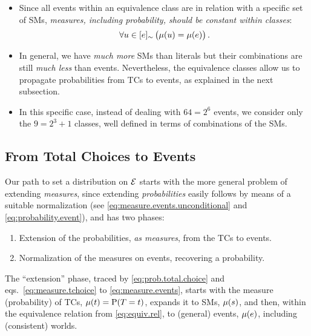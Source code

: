 \documentclass[a4paper, 10pt]{article}
\newcommand{\at}[1]{\ensuremath{\!\del{#1}}}
\newcommand{\fml}[1]{\ensuremath{{\cal #1}}}
\newcommand{\pr}[1]{\ensuremath{\mathrm{P}\at{#1}}}
\newcommand{\pw}[1]{\ensuremath{\mu\at{#1}}}
\newcommand{\class}[1]{\ensuremath{[{#1}]_{\sim}}}
\begin{document}
\begin{itemize}
    \item Since all events within an equivalence class are in relation with a specific set of \aclp{SM}, \emph{measures, including probability, should be constant within classes}:
          \[
              \forall u\in \class{e} \left(\mu\at{u} = \mu\at{e} \right).
          \]
    \item In general, we have \emph{much more} \aclp{SM} than literals but their combinations are still \emph{much less} than events. Nevertheless, the equivalence classes allow us to propagate probabilities from \aclp{TC} to events, as explained in the next subsection.
    \item In this specific case, instead of dealing with $64 = 2^6$ events, we consider only the $9 = 2^3 + 1$ classes, well defined in terms of combinations of the \aclp{SM}.
\end{itemize}
%
%
%
\subsection{From Total Choices to Events}\label{subsec:from.tchoices.to.events}
%
%
%
Our path to set a distribution on $\fml{E}$ starts with the more general problem of extending \emph{measures}, since extending \emph{probabilities} easily follows by means of a suitable normalization (see \eqref{eq:measure.events.unconditional} and \eqref{eq:probability.event}), and has two phases:
\begin{enumerate}
    \item Extension of the probabilities, \emph{as measures}, from the \aclp{TC} to events.
    \item Normalization of the measures on events, recovering a probability.
\end{enumerate}

The ``extension'' phase, traced by \cref{eq:prob.total.choice} and eqs.\ \eqref{eq:measure.tchoice} to \eqref{eq:measure.events}, starts with the measure (probability) of \aclp{TC}, $\pw{t} = \pr{T = t}$, expands it to \aclp{SM}, $\pw{s}$, and then, within the equivalence relation from \cref{eq:equiv.rel}, to (general) events, $\pw{e}$, including (consistent) worlds.
\end{document}
